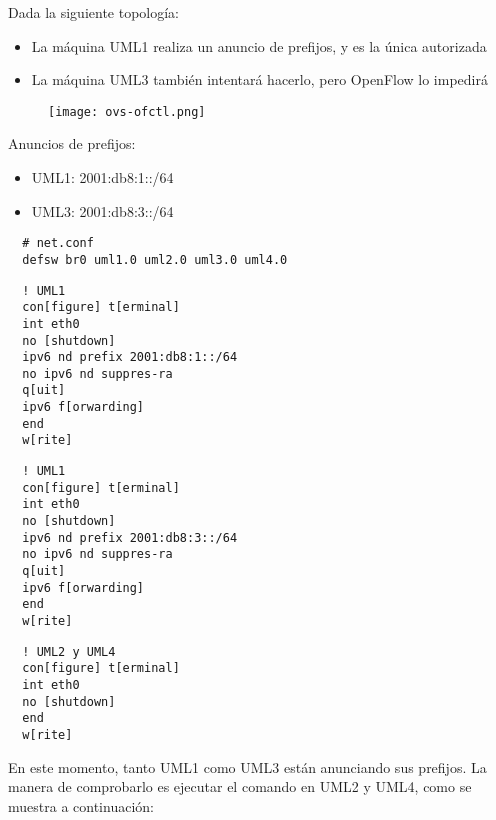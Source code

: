 
Dada la siguiente topología:

\begin{itemize}
  \item La máquina UML1 realiza un anuncio de prefijos, y es la única
  autorizada
  \item La máquina UML3 también intentará hacerlo, pero OpenFlow lo impedirá
\end{itemize}

\begin{figure}[h]
  \texttt{[image: ovs-ofctl.png]}
  \centering
\end{figure}

Anuncios de prefijos:

\begin{itemize}
  \item UML1: 2001:db8:1::/64
  \item UML3: 2001:db8:3::/64
\end{itemize}

\begin{verbatim}
  # net.conf
  defsw br0 uml1.0 uml2.0 uml3.0 uml4.0
\end{verbatim}

\begin{verbatim}
  ! UML1
  con[figure] t[erminal]
  int eth0
  no [shutdown]
  ipv6 nd prefix 2001:db8:1::/64
  no ipv6 nd suppres-ra
  q[uit]
  ipv6 f[orwarding]
  end
  w[rite]
\end{verbatim}

\begin{verbatim}
  ! UML1
  con[figure] t[erminal]
  int eth0
  no [shutdown]
  ipv6 nd prefix 2001:db8:3::/64
  no ipv6 nd suppres-ra
  q[uit]
  ipv6 f[orwarding]
  end
  w[rite]
\end{verbatim}

\begin{verbatim}
  ! UML2 y UML4
  con[figure] t[erminal]
  int eth0
  no [shutdown]
  end
  w[rite]
\end{verbatim}

En este momento, tanto UML1 como UML3 están anunciando sus prefijos.
La manera de comprobarlo es ejecutar el comando 
en UML2 y UML4, como se muestra a continuación:

